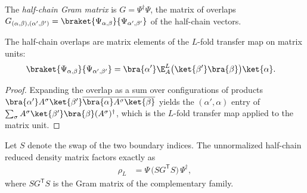 \begin{definition}%
    \label{def:half_chain_gram}
    \leanok
    The \emph{half-chain Gram matrix} is $G=\Psi^{\dagger}\Psi$, the matrix of
    overlaps
    $G_{(\alpha,\beta),(\alpha',\beta')}
        =\braket{\Psi_{\alpha,\beta}}{\Psi_{\alpha',\beta'}}$ of the half-chain
    vectors.
\end{definition}

\begin{lemma}%
    \label{lem:half_chain_gram_transfer}
    \leanok
    The half-chain overlaps are matrix elements of the $L$-fold transfer map
    on matrix units:
    \begin{align}
        \braket{\Psi_{\alpha,\beta}}{\Psi_{\alpha',\beta'}}
         & =\bra{\alpha'}\E_A^{L}
        \bigl(\ket{\beta'}\bra{\beta}\bigr)\ket{\alpha}.
        \label{eq:half_chain_gram_transfer}
    \end{align}
\end{lemma}

\begin{proof}
    \leanok
    Expanding the overlap as a sum over configurations of products
    $\bra{\alpha'}A^{\sigma}\ket{\beta'}
        \overline{\bra{\alpha}A^{\sigma}\ket{\beta}}$ yields the $(\alpha',\alpha)$ entry of
    $\sum_{\sigma}A^{\sigma}\ket{\beta'}\bra{\beta}(A^{\sigma})^{\dagger}$,
    which is the $L$-fold transfer map applied to the matrix unit.
\end{proof}

\begin{lemma}%
    \label{thm:half_chain_schmidt_factorization}
    \leanok
    Let $S$ denote the swap of the two boundary indices. The unnormalized
    half-chain reduced density matrix factors exactly as
    \begin{align}
        \rho_L
         & =\Psi\,\bigl(SG^{\mathsf T}S\bigr)\,\Psi^{\dagger},
        \label{eq:half_chain_factorization}
    \end{align}
    where $SG^{\mathsf T}S$ is the Gram matrix of the complementary family.
\end{lemma}

